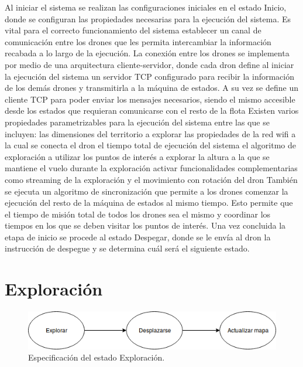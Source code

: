 Al iniciar el sistema se realizan las configuraciones iniciales en el estado Inicio, donde se configuran las propiedades necesarias para la ejecución del sistema.
Es vital para el correcto funcionamiento del sistema establecer un canal de comunicación entre los drones que les permita intercambiar la información recabada a lo largo de la ejecución. La conexión entre los drones se implementa por medio de una arquitectura cliente-servidor, donde cada dron define al iniciar la ejecución del sistema un servidor TCP configurado para recibir la información de los demás drones y transmitirla a la máquina de estados. A su vez se define un cliente TCP para poder enviar los mensajes necesarios, siendo el mismo accesible desde los estados que requieran comunicarse con el resto de la flota
Existen varios propiedades parametrizables para la ejecución del sistema entre las que se incluyen:
las dimensiones del territorio a explorar 
las propiedades de la red wifi a la cual se conecta el dron
el tiempo total de ejecución del sistema
el algoritmo de exploración a utilizar
los puntos de interés a explorar
la altura a la que se mantiene el vuelo durante la exploración
activar funcionalidades complementarias como streaming de la exploración y el movimiento con rotación del dron
También se ejecuta un algoritmo de sincronización que permite a los drones comenzar la ejecución del resto de la máquina de estados al mismo tiempo. Esto permite que el tiempo de misión total de todos los drones sea el mismo y coordinar los tiempos en los que se deben visitar los puntos de interés.
Una vez concluida la etapa de inicio se procede al estado Despegar, donde se le envía al dron la instrucción de despegue y se determina cuál será el siguiente estado. 
\section {Exploración}

\begin{figure}[h!]
	\label{fig:comp}
	\includegraphics[width=.8\textwidth]{imagenes/chap5/image3}
	\caption{Especificación del estado Exploración.}
\end{figure}

